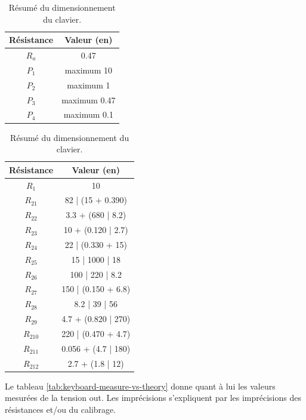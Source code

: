 \begin{table}[ht]
	\centering
		\begin{tabular}{|c|c|}
			\hline
				Résistance & Valeur (en\unit{}{\kilo\ohm}) \\
			\hline
				$R_a$ & 0.47 \\
			\hline
				$P_1$ & maximum 10 \\
			\hline
				$P_2$ & maximum 1 \\
			\hline
				$P_3$ & maximum 0.47 \\
			\hline
				$P_4$ & maximum 0.1 \\
			\hline
		\end{tabular}
		\quad
		\begin{tabular}{|c|c|}
			\hline
				Résistance & Valeur (en\unit{}{\kilo\ohm}) \\
			\hline
				$R_1$ & 10 \\
			\hline
				$R_{21}$ & 82 | (15 + 0.390) \\
			\hline
				$R_{22}$ & 3.3 + (680 | 8.2) \\
			\hline
				$R_{23}$ & 10 + (0.120 | 2.7) \\
			\hline
				$R_{24}$ & 22 | (0.330 + 15) \\
			\hline
				$R_{25}$ & 15 | 1000 | 18 \\
			\hline
				$R_{26}$ & 100 | 220 | 8.2 \\
			\hline
				$R_{27}$ & 150 | (0.150 + 6.8) \\
			\hline
				$R_{28}$ & 8.2 | 39 | 56 \\
			\hline
				$R_{29}$ & 4.7 + (0.820 | 270) \\
			\hline
				$R_{210}$ & 220 | (0.470 + 4.7) \\
			\hline
				$R_{211}$ & 0.056 + (4.7 | 180) \\
			\hline
				$R_{212}$ & 2.7 + (1.8 | 12) \\
			\hline
		\end{tabular}
	\caption{Résumé du dimensionnement du clavier.}
	\label{tab:keyboard-dim}
\end{table}

Le tableau \ref{tab:keyboard-measure-vs-theory} donne quant
à lui les valeurs mesurées de la tension out. Les imprécisions
s'expliquent par les imprécisions des résistances et/ou du
calibrage.

